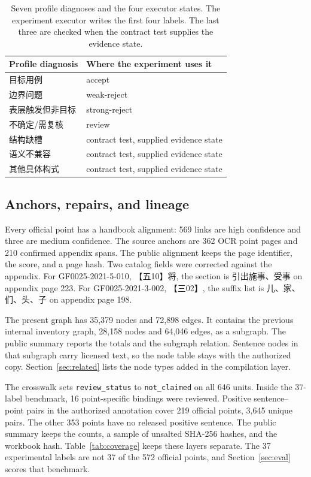 \documentclass[pdflatex,sn-mathphys,NameDate]{sn-jnl}
\begin{document}
\begin{table}[!ht]
\centering
\small
\begin{tabular}{ll}
\toprule
Profile diagnosis & Where the experiment uses it \\
\midrule
目标用例 & accept \\
边界问题 & weak-reject \\
表层触发但非目标 & strong-reject \\
不确定/需复核 & review \\
结构缺槽 & contract test, supplied evidence state \\
语义不兼容 & contract test, supplied evidence state \\
其他具体构式 & contract test, supplied evidence state \\
\bottomrule
\end{tabular}
\caption{Seven profile diagnoses and the four executor states. The experiment executor writes the first four labels. The last three are checked when the contract test supplies the evidence state.}
\label{tab:diagnosis}
\end{table}

\subsection{Anchors, repairs, and lineage}

Every official point has a handbook alignment: 569 links are high confidence and three are medium confidence.
The source anchors are 362 OCR point pages and 210 confirmed appendix spans.
The public alignment keeps the page identifier, the score, and a page hash.
Two catalog fields were corrected against the appendix.
For GF0025-2021-5-010, 【五10】将, the section is 引出施事、受事 on appendix page 223.
For GF0025-2021-3-002, 【三02】, the suffix list is 儿、家、们、头、子 on appendix page 198.

The present graph has 35,379 nodes and 72,898 edges.
It contains the previous internal inventory graph, 28,158 nodes and 64,046 edges, as a subgraph.
The public summary reports the totals and the subgraph relation.
Sentence nodes in that subgraph carry licensed text, so the node table stays with the authorized copy.
Section~\ref{sec:related} lists the node types added in the compilation layer.

The crosswalk sets \texttt{review\_status} to \texttt{not\_claimed} on all 646 units.
Inside the 37-label benchmark, 16 point-specific bindings were reviewed.
Positive sentence--point pairs in the authorized annotation cover 219 official points, 3,645 unique pairs.
The other 353 points have no released positive sentence.
The public summary keeps the counts, a sample of unsalted SHA-256 hashes, and the workbook hash.
Table~\ref{tab:coverage} keeps these layers separate.
The 37 experimental labels are not 37 of the 572 official points, and Section~\ref{sec:eval} scores that benchmark.
\end{document}
